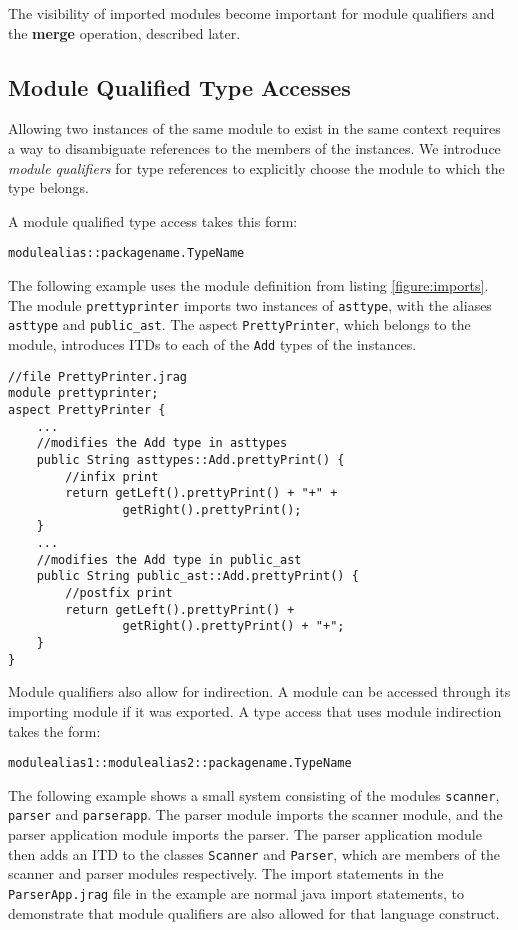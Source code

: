The visibility of imported modules become important for module qualifiers and the \textbf{merge} operation, described later.

\subsection{Module Qualified Type Accesses}

Allowing two instances of the same module to exist in the same context
requires a way to disambiguate references to the members of the instances.
We introduce \textit{module qualifiers} for type references to explicitly
choose the module to which the type belongs.

A module qualified type access takes this form:

\begin{lstlisting}
modulealias::packagename.TypeName
\end{lstlisting}

The following example uses the module definition from listing \ref{figure:imports}.
The module \texttt{prettyprinter} imports two instances of \texttt{asttype}, with the
aliases \texttt{asttype} and \texttt{public\_ast}. The aspect \texttt{PrettyPrinter},
which belongs to the module, introduces ITDs to each of the \texttt{Add} types
of the instances.

\begin{lstlisting}[caption={Module Qualfiers}]
//file PrettyPrinter.jrag
module prettyprinter;
aspect PrettyPrinter {
	...
	//modifies the Add type in asttypes
	public String asttypes::Add.prettyPrint() {
		//infix print
		return getLeft().prettyPrint() + "+" + 
				getRight().prettyPrint();
	}
	...
	//modifies the Add type in public_ast
	public String public_ast::Add.prettyPrint() {
		//postfix print
		return getLeft().prettyPrint() + 
				getRight().prettyPrint() + "+";
	}
}
\end{lstlisting}

Module qualifiers also allow for indirection. A module can be accessed 
through its importing module if it was exported. A type access
that uses module indirection takes the form:

\begin{lstlisting}
modulealias1::modulealias2::packagename.TypeName
\end{lstlisting}

The following example
shows a small system consisting of the modules \texttt{scanner}, 
\texttt{parser} and \texttt{parserapp}. The parser module imports
the scanner module, and the parser application module imports the
parser. The parser application module then adds an ITD to the classes
\texttt{Scanner} and \texttt{Parser}, which are members of the scanner
and parser modules respectively. The import statements in the 
\texttt{ParserApp.jrag} file in the example are normal java import
statements, to demonstrate that module qualifiers are also allowed
for that language construct.

